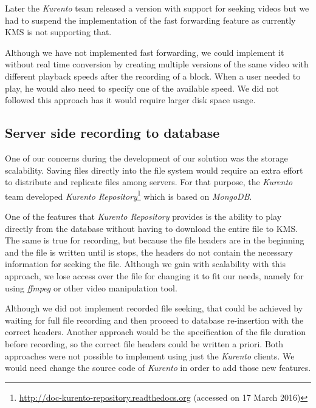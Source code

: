 	Later the \emph{Kurento} team released a version with support for seeking videos but we had to suspend the implementation of the fast forwarding feature as currently \ac{KMS} is not supporting that.

	Although we have not implemented fast forwarding, we could implement it without real time conversion by creating multiple versions of the same video with different playback speeds after the recording of a block. When a user needed to play, he would also need to specify one of the available speed. We did not followed this approach has it would require larger disk space usage. 

\subsection{Server side recording to database}

	One of our concerns during the development of our solution was the storage scalability. Saving files directly into the file system would require an extra effort to distribute and replicate files among servers. For that purpose, the \emph{Kurento} team developed \emph{Kurento Repository}\footnote{\url{http://doc-kurento-repository.readthedocs.org} (accessed on 17 March 2016)} which is based on \emph{MongoDB}.

	One of the features that \emph{Kurento Repository} provides is the ability to play directly from the database without having to download the entire file to \ac{KMS}. The same is true for recording, but because the file headers are in the beginning and the file is written until is stops, the headers do not contain the necessary information for seeking the file.
	Although we gain with scalability with this approach, we lose access over the file for changing it to fit our needs, namely for using \emph{ffmpeg} or other video manipulation tool.
        
	Although we did not implement recorded file seeking, that could be achieved by waiting for full file recording and then proceed to database re-insertion with the correct headers. Another approach would be the specification of the file duration before recording, so the correct file headers could be written a priori. Both approaches were not possible to implement using just the \emph{Kurento} clients. We would need change the source code of \emph{Kurento} in order to add those new features.
        
    



